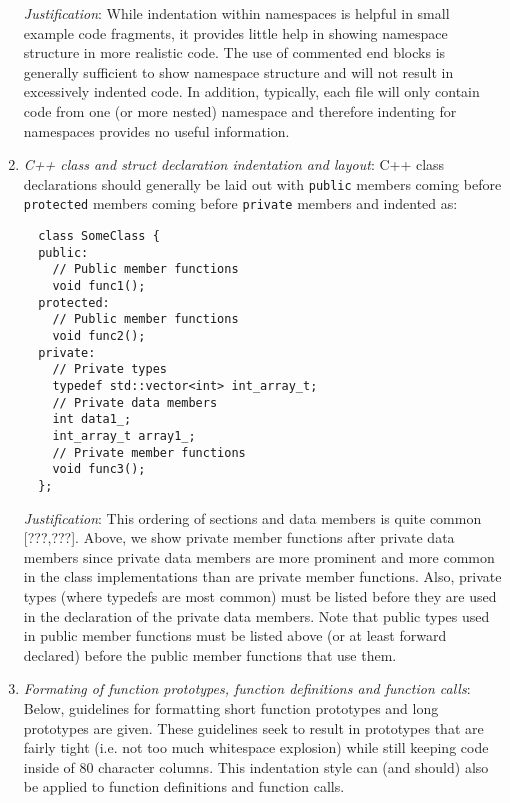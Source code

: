 \begin{enumerate}
{}\textit{Justification}: While indentation within namespaces is helpful in
small example code fragments, it provides little help in showing namespace
structure in more realistic code.  The use of commented end blocks is
generally sufficient to show namespace structure and will not result in
excessively indented code.  In addition, typically, each file will only
contain code from one (or more nested) namespace and therefore indenting for
namespaces provides no useful information.

{}\item\textit{C++ class and struct declaration indentation and layout}: C++
class declarations should generally be laid out with {}\texttt{public}
members coming before {}\texttt{protected} members coming before
{}\texttt{private} members and indented as:

{\small\begin{verbatim}
  class SomeClass {
  public:
    // Public member functions
    void func1();
  protected:
    // Public member functions
    void func2();
  private:
    // Private types
    typedef std::vector<int> int_array_t;
    // Private data members
    int data1_;
    int_array_t array1_;
    // Private member functions
    void func3();
  };
\end{verbatim}}

{}\textit{Justification}: This ordering of sections and data members is quite
common [???,???].  Above, we show private member functions after private data
members since private data members are more prominent and more common in the
class implementations than are private member functions.  Also, private types
(where typedefs are most common) must be listed before they are used in the
declaration of the private data members.  Note that public types used in
public member functions must be listed above (or at least forward declared)
before the public member functions that use them.

{}\item\textit{Formating of function prototypes, function definitions and
function calls}: Below, guidelines for formatting short function prototypes
and long prototypes are given.  These guidelines seek to result in prototypes
that are fairly tight (i.e. not too much whitespace explosion) while still
keeping code inside of 80 character columns.  This indentation style can (and
should) also be applied to function definitions and function calls.

  \begin{enumerate}


\end{enumerate}
\end{enumerate}
